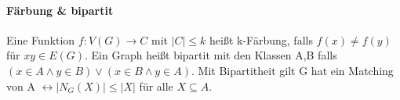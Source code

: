 \documentclass[10pt,landscape]{article}
\begin{document}
\begin{multicols}{3}
\paragraph{Färbung \& bipartit}
Eine Funktion $f:V(G)\rightarrow C$ mit $|C|\leq k$ heißt k-Färbung, falls $f(x)\not = f(y)$ für $xy\in E(G)$.
Ein Graph heißt bipartit mit den Klassen A,B falls $(x\in A \wedge y\in B)\vee (x\in B \wedge y\in A)$. 
Mit Bipartitheit gilt G hat ein Matching von A $\leftrightarrow |N_G(X)|\leq |X|$ für alle $X\subseteq A$.

\end{multicols}
\end{document}
